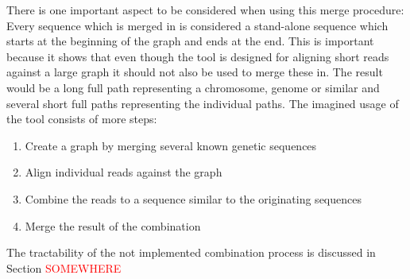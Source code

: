 \documentclass[thesis.tex]{subfiles}
\begin{document}
\par\noindent
There is one important aspect to be considered when using this merge procedure: Every sequence which is merged in is considered a stand-alone sequence which starts at the beginning of the graph and ends at the end. This is important because it shows that even though the tool is designed for aligning short reads against a large graph it should not also be used to merge these in. The result would be a long full path representing a chromosome, genome or similar and several short full paths representing the individual paths. The imagined usage of the tool consists of more steps:
\begin{enumerate}
  \item Create a graph by merging several known genetic sequences
  \item Align individual reads against the graph
  \item Combine the reads to a sequence similar to the originating sequences
  \item Merge the result of the combination
\end{enumerate}
The tractability of the not implemented combination process is discussed in Section \textcolor{red}{SOMEWHERE}
\end{document}
